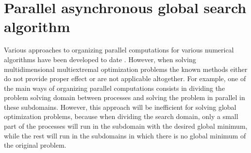 \documentclass[runningheads]{llncs}
\begin{document}
\section{Parallel asynchronous global search algorithm}\label{sec:PA}

Various approaches to organizing parallel computations for various numerical algorithms have been developed to date \cite{Voevodin2015}. However, when solving multidimensional multiextremal optimization problems the known methods either do not provide proper effect or are not applicable altogether. For example, one of the main ways of organizing parallel computations consists in dividing the problem solving domain between processes and solving the problem in parallel in these subdomains. However, this approach will be inefficient for solving global optimization problems, because when dividing the search domain, only a small part of the processes will run in the subdomain with the desired global minimum, while the rest will run in the subdomains in which there is no global minimum of the original problem.
\end{document}
